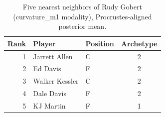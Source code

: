 \begin{table}[htbp]
  \centering\small
  \begin{tabular}{rllc}
    \toprule
    Rank & Player & Position & Archetype \\
    \midrule
    1 & Jarrett Allen & C & 2 \\
    2 & Ed Davis & F & 2 \\
    3 & Walker Kessler & C & 2 \\
    4 & Dale Davis & F & 2 \\
    5 & KJ Martin & F & 1 \\
    \bottomrule
  \end{tabular}
  \caption{Five nearest neighbors of Rudy Gobert (curvature_m1 modality), Procrustes-aligned posterior mean.}
  \label{tab:Rudy_Gobert_neighbors_curvature_m1}
\end{table}

